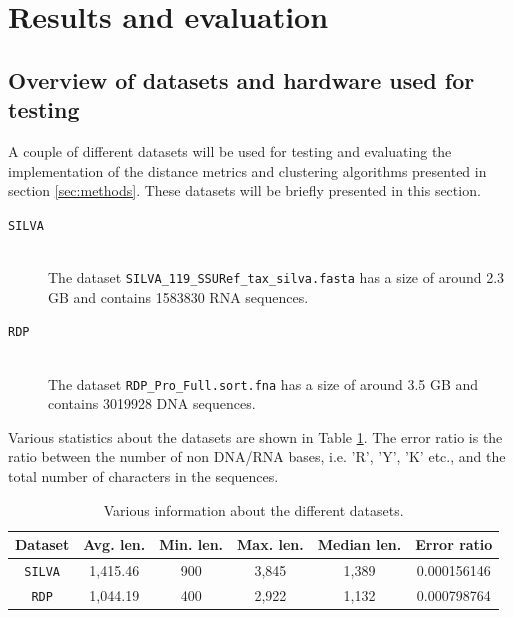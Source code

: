 \section{Results and evaluation} \label{sec:results}

\subsection{Overview of datasets and hardware used for testing}
\label{sec:overview_of_datasets}

A couple of different datasets will be used for testing and evaluating the
implementation of the distance metrics and clustering algorithms presented in
section \ref{sec:methods}. These datasets will be briefly presented in this
section.

\begin{description}
  \item[\texttt{SILVA}] \hfill \\
    The dataset \texttt{SILVA\_119\_SSURef\_tax\_silva.fasta} has a size of
    around 2.3 GB and contains \num{1583830} RNA sequences.

  \item[\texttt{RDP}] \hfill \\
    The dataset \texttt{RDP\_Pro\_Full.sort.fna} has a size of around 3.5 GB
    and contains \num{3019928} DNA sequences.
\end{description}

Various statistics about the datasets are shown in Table \ref{tab:data_stats}.
The error ratio is the ratio between the number of non DNA/RNA bases, i.e. 'R',
'Y', 'K' etc., and the total number of characters in the sequences.

\begin{table}[H]
  \centering
  \begin{tabular}{c | c | c | c | c | c}
    Dataset        & Avg. len. & Min. len. & Max. len. & Median len. & Error ratio \\
    \hline
    \texttt{SILVA} & 1,415.46  & 900       & 3,845     & 1,389       & 0.000156146 \\
    \texttt{RDP}   & 1,044.19  & 400       & 2,922     & 1,132       & 0.000798764 \\
  \end{tabular}
  \caption{Various information about the different datasets.}
  \label{tab:data_stats}
\end{table}

